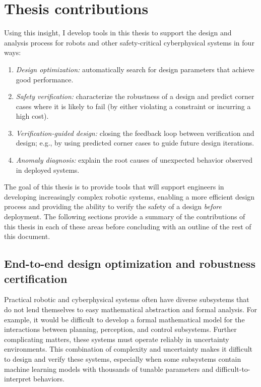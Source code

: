 \section{Thesis contributions}

Using this insight, I develop tools in this thesis to support the design and analysis process for robots and other safety-critical cyberphysical systems in four ways:
\begin{enumerate}
    \item \textit{Design optimization:} automatically search for design parameters that achieve good performance.
    \item \textit{Safety verification:} characterize the robustness of a design and predict corner cases where it is likely to fail (by either violating a constraint or incurring a high cost).
    \item \textit{Verification-guided design:} closing the feedback loop between verification and design; e.g., by using predicted corner cases to guide future design iterations.
    \item \textit{Anomaly diagnosis:} explain the root causes of unexpected behavior observed in deployed systems.
\end{enumerate}
%
The goal of this thesis is to provide tools that will support engineers in developing increasingly complex robotic systems, enabling a more efficient design process and providing the ability to verify the safety of a design \textit{before} deployment. The following sections provide a summary of the contributions of this thesis in each of these areas before concluding with an outline of the rest of this document.

\subsection{End-to-end design optimization and robustness certification}

Practical robotic and cyberphysical systems often have diverse subsystems that do not lend themselves to easy mathematical abstraction and formal analysis. For example, it would be difficult to develop a formal mathematical model for the interactions between planning, perception, and control subsystems. Further complicating matters, these systems must operate reliably in uncertainty environments. This combination of complexity and uncertainty makes it difficult to design and verify these systems, especially when some subsystems contain machine learning models with thousands of tunable parameters and difficult-to-interpret behaviors.

